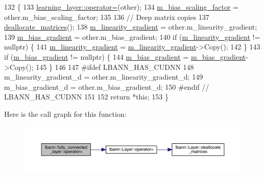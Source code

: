 \begin{DoxyCode}
132                                                                        \{
133     \hyperlink{classlbann_1_1Layer_a00d8acde68fda2f38c4a39ef8c89234a}{learning\_layer::operator=}(other);
134     \hyperlink{classlbann_1_1fully__connected__layer_ae02eaffd5528bf572883f8b06d1b40c0}{m\_bias\_scaling\_factor} = other.m\_bias\_scaling\_factor;
135 
136     \textcolor{comment}{// Deep matrix copies}
137     \hyperlink{classlbann_1_1fully__connected__layer_a91f359a41cfbab6f21bd67bccb8409b1}{deallocate\_matrices}();
138     \hyperlink{classlbann_1_1fully__connected__layer_ab80f9cb94662ce4d90aa6d8b5cfa0803}{m\_linearity\_gradient} = other.m\_linearity\_gradient;
139     \hyperlink{classlbann_1_1fully__connected__layer_a6510917c573378f40789a1d16db22b4e}{m\_bias\_gradient} = other.m\_bias\_gradient;
140     \textcolor{keywordflow}{if} (\hyperlink{classlbann_1_1fully__connected__layer_ab80f9cb94662ce4d90aa6d8b5cfa0803}{m\_linearity\_gradient} != \textcolor{keyword}{nullptr}) \{
141       \hyperlink{classlbann_1_1fully__connected__layer_ab80f9cb94662ce4d90aa6d8b5cfa0803}{m\_linearity\_gradient} = \hyperlink{classlbann_1_1fully__connected__layer_ab80f9cb94662ce4d90aa6d8b5cfa0803}{m\_linearity\_gradient}->Copy();
142     \}
143     \textcolor{keywordflow}{if} (\hyperlink{classlbann_1_1fully__connected__layer_a6510917c573378f40789a1d16db22b4e}{m\_bias\_gradient} != \textcolor{keyword}{nullptr}) \{
144       \hyperlink{classlbann_1_1fully__connected__layer_a6510917c573378f40789a1d16db22b4e}{m\_bias\_gradient} = \hyperlink{classlbann_1_1fully__connected__layer_a6510917c573378f40789a1d16db22b4e}{m\_bias\_gradient}->Copy();
145     \}
146 
147 \textcolor{preprocessor}{  #ifdef LBANN\_HAS\_CUDNN}
148     m\_linearity\_gradient\_d = other.m\_linearity\_gradient\_d;
149     m\_bias\_gradient\_d = other.m\_bias\_gradient\_d;
150 \textcolor{preprocessor}{  #endif // LBANN\_HAS\_CUDNN}
151 
152     \textcolor{keywordflow}{return} *\textcolor{keyword}{this};
153   \}
\end{DoxyCode}
Here is the call graph for this function\+:\nopagebreak
\begin{figure}[H]
\begin{center}
\leavevmode
\includegraphics[width=350pt]{classlbann_1_1fully__connected__layer_ab06d01021d4e89cd2f4f64c330e7cc31_cgraph}
\end{center}
\end{figure}
\mbox{\label{classlbann_1_1fully__connected__layer_aec4298146845489597126503177d3127}} 
